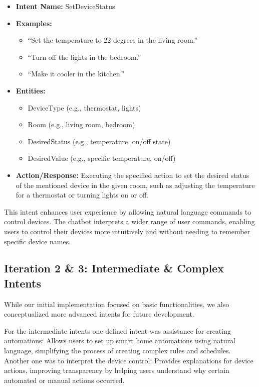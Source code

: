 \begin{itemize}
    \item \textbf{Intent Name:} SetDeviceStatus
    \item \textbf{Examples:}
    \begin{itemize}
        \item ``Set the temperature to 22 degrees in the living room.''
        \item ``Turn off the lights in the bedroom.''
        \item ``Make it cooler in the kitchen.''
    \end{itemize}
    \item \textbf{Entities:}
    \begin{itemize}
        \item DeviceType (e.g., thermostat, lights)
        \item Room (e.g., living room, bedroom)
        \item DesiredStatus (e.g., temperature, on/off state)
        \item DesiredValue (e.g., specific temperature, on/off)
    \end{itemize}
    \item \textbf{Action/Response:} Executing the specified action to set the desired status of the mentioned device in the given room, such as adjusting the temperature for a thermostat or turning lights on or off.
\end{itemize}

This intent enhances user experience by allowing natural language commands to control devices. The chatbot interprets a wider range of user commands, enabling users to control their devices more intuitively and without needing to remember specific device names.

\subsection{Iteration 2 \& 3: Intermediate \& Complex Intents}
While our initial implementation focused on basic functionalities, we also conceptualized more advanced intents for future development.

For the intermediate intents one defined intent was assistance for creating automations: Allows users to set up smart home automations using natural language, simplifying the process of creating complex rules and schedules.
Another one was to interpret the device control: Provides explanations for device actions, improving transparency by helping users understand why certain automated or manual actions occurred.


